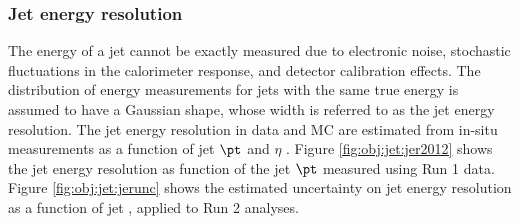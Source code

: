 \subsubsection{Jet energy resolution}
The energy of a jet cannot be exactly measured due to electronic noise, stochastic fluctuations in the calorimeter response, and detector calibration effects. The distribution of energy measurements for jets with the same true energy is assumed to have a Gaussian shape, whose width is referred to as the jet energy resolution. The jet energy resolution in data and MC are estimated from in-situ measurements as a function of jet $\pt$ and $\eta$ \cite{ATLAS-CONF-2015-057,ATLAS-CONF-2015-017}. Figure \ref{fig:obj:jet:jer2012} shows the jet energy resolution as function of the jet $\pt$ measured using Run 1 data. Figure \ref{fig:obj:jet:jerunc} shows the estimated uncertainty on jet energy resolution as a function of jet \pt, applied to Run 2 analyses.
